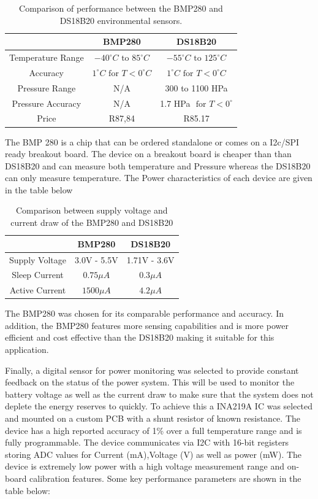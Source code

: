\begin{table}[H]
	\centering
	\caption{Comparison of performance between the BMP280 and DS18B20 environmental sensors.}
	\begin{tabular}{|c|c|c|}
		\hline
		& \textbf{BMP280} & \textbf{DS18B20} \\
		\hline
		Temperature Range & $-40^\circ C \text{ to } 85^\circ C$&$-55^\circ C \text{ to } 125^\circ C$ \\
		\hline
		Accuracy & $1^\circ C \text{ for } T < 0^\circ C$ & $1^\circ C \text{ for } T < 0^\circ C$ \\
		\hline
		Pressure Range  & N/A & 300 to 1100 HPa \\
		\hline
		Pressure Accuracy & N/A & 1.7 HPa $ \text{ for } T < 0^\circ $\\
		\hline
		Price & R87,84 & R85.17 \\
		\hline
	\end{tabular}
	\label{tab:senv_spec}
\end{table}

The BMP 280 is a chip that can be ordered standalone or comes on a I2c/SPI ready breakout board. The device on a breakout board is cheaper than than DS18B20 and can measure both temperature and Pressure whereas the DS18B20 can only measure temperature. The Power characteristics of each device are given in the table below

\begin{table}[H]
	\centering
	\caption{Comparison between supply voltage and current draw of the BMP280 and DS18B20}
	\begin{tabular}{|c|c|c|}
		\hline
		&  \textbf{BMP280} & \textbf{DS18B20}\\
		\hline
		Supply Voltage & 3.0V - 5.5V & 1.71V - 3.6V\\
		Sleep Current & $0.75\mu A$ & $0.3\mu A$\\ 
		Active Current & $1500\mu A $ & $4.2\mu A$\\
		\hline
	\end{tabular}
	
	\label{tab:env_power}
\end{table}

The BMP280 was chosen for its comparable performance and accuracy. In addition, the BMP280 features more sensing capabilities and is more power efficient and cost effective than the DS18B20 making it suitable for this application.\par 

Finally, a digital sensor for power monitoring was selected to provide constant feedback on the status of the power system. This will be used to monitor the battery voltage as well as the current draw to make sure that the system does not deplete the energy reserves to quickly. To achieve this a INA219A IC was selected and mounted on a custom PCB with a shunt resistor of known resistance. The device has a high reported accuracy of 1\% over a full temperature range and is fully programmable. The device  communicates via I2C with 16-bit registers storing ADC values for  Current (mA),Voltage (V) as well as power (mW). The device is extremely low power with a high voltage measurement range and on-board calibration features. Some key performance parameters are shown in the table below:

